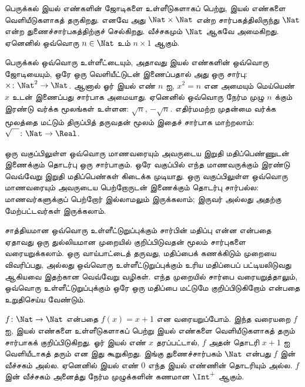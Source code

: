 \documentclass[../../../include/open-logic-section]{subfiles}
\begin{document}
\begin{ex}
பெருக்கல் இயல் எண்களின் ஜோடிகளை உள்ளீடுகளாகப் பெற்று, இயல் எண்களை
வெளியீடுகளாகத் தருகிறது. எனவே அது $\Nat \times \Nat$ என்ற சார்பகத்திலிருந்து
$\Nat$ என்ற துணைச்சார்பகத்திற்குச் செல்கிறது.
வீச்சகமும் $\Nat$ ஆகவே அமைகிறது. ஏனெனில் ஒவ்வொரு $n \in \Nat$ உம்
$n \times 1$ ஆகும்.
\end{ex}

\begin{ex}
பெருக்கல் ஒவ்வொரு உள்ளீட்டையும், அதாவது இயல் எண்களின் ஒவ்வொரு ஜோடியையும்,
ஒரே ஒரு வெளியீட்டுடன் இணைப்பதால் அது ஒரு சார்பு:
$\times \colon \Nat^2 \to
\Nat$. ஆனால் ஓர் இயல் எண் $n$ ஐ, $x^2 = n$ என அமையும் மெய்யெண்
$x$ உடன் இணைப்பது சார்பாக அமையாது. ஏனெனில் ஒவ்வொரு நேர்ம முழு $n$ க்கும்
இரண்டு வர்க்க மூலங்கள் உள்ளன: $\sqrt{n}$, $-\sqrt{n}$.
எதிர்மமற்ற முதன்மை வர்க்க மூலத்தை மட்டும் திருப்பித் தருவதன் மூலம் இதைச் சார்பாக
மாற்றலாம்: $\sqrt{\phantom{X}} \colon
\Nat \to \Real$.
\end{ex}

\begin{ex}
ஒரு வகுப்பிலுள்ள ஒவ்வொரு மாணவரையும் அவருடைய இறுதி மதிப்பெண்ணுடன்
இணைக்கும் தொடர்பு ஒரு சார்பாகும். ஒரே வகுப்பில் எந்த மாணவருக்கும்
இரண்டு வெவ்வேறு இறுதி மதிப்பெண்கள் கிடைக்க முடியாது.
ஒரு வகுப்பிலுள்ள ஒவ்வொரு மாணவரையும் அவருடைய பெற்றோருடன் இணைக்கும்
தொடர்பு சார்பல்ல: மாணவர்களுக்குப் பெற்றோர் இல்லாமலும் இருக்கலாம்;
இருவர் அல்லது அதற்கு மேற்பட்டவர்கள் இருக்கலாம்.
\end{ex}

\begin{explain}
சாத்தியமான ஒவ்வொரு உள்ளீட்டுறுப்புக்கும் சார்பின் மதிப்பு என்ன என்பதை
ஏதாவது ஒரு துல்லியமான முறையில் குறிப்பிடுவதன் மூலம் சார்புகளை
வரையறுக்கலாம். ஒரு வாய்பாட்டைத் தருவது, மதிப்பைக் கணக்கிடும் முறையை
விவரிப்பது, அல்லது ஒவ்வொரு உள்ளீட்டுறுப்புக்கும் உரிய மதிப்பைப்
பட்டியலிடுவது ஆகியவை இதற்கான வெவ்வேறு வழிகள். எந்த முறையில் சார்பை
வரையறுத்தாலும், ஒவ்வொரு உள்ளீட்டுறுப்புக்கும் ஒரே ஒரு மதிப்பை மட்டுமே
குறிப்பிடுகிறோம் என்பதை உறுதிசெய்ய வேண்டும்.
\end{explain}

\begin{ex}
$f \colon \Nat \to \Nat$ என்பதை $f(x) = x+1$ என வரையறுப்போம்.
இந்த வரையறை $f$ ஐ, இயல் எண்களை உள்ளீடுகளாகப் பெற்று இயல் எண்களை
வெளியீடுகளாகத் தரும் சார்பாகக் குறிப்பிடுகிறது.
ஓர் இயல் எண் $x$ தரப்பட்டால், $f$ அதன் தொடரி $x+1$ ஐ வெளியீடாகத்
தரும் என இது கூறுகிறது. இங்கு துணைச்சார்பகம் $\Nat$ என்பது $f$ இன்
வீச்சகம் அல்ல. ஏனெனில் இயல் எண் $0$ எந்த இயல் எண்ணின் தொடரியும் அல்ல.
$f$ இன் வீச்சகம் அனைத்து நேர்ம முழுக்களின் கணமான $\Int^{+}$ ஆகும்.
\end{ex}
\end{document}

